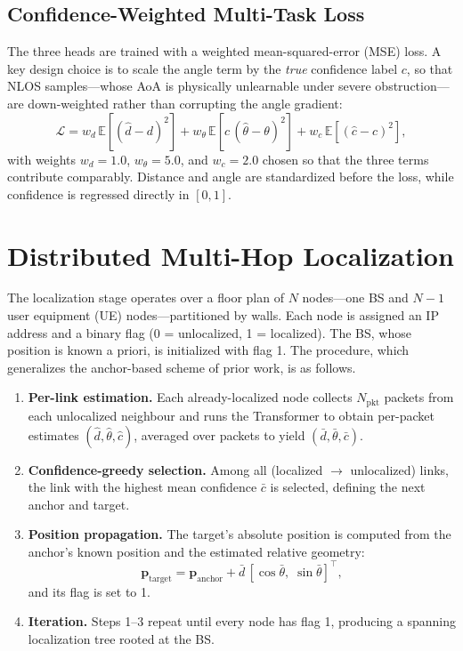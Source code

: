 \documentclass[conference]{IEEEtran}
\begin{document}
\subsection{Confidence-Weighted Multi-Task Loss}
The three heads are trained with a weighted mean-squared-error (MSE) loss. A key
design choice is to scale the angle term by the \emph{true} confidence label
$c$, so that NLOS samples---whose AoA is physically unlearnable under severe
obstruction---are down-weighted rather than corrupting the angle gradient:
\begin{equation}
  \mathcal{L} = w_{d}\,\mathbb{E}\!\left[(\hat{d}-d)^2\right]
    + w_{\theta}\,\mathbb{E}\!\left[c\,(\hat{\theta}-\theta)^2\right]
    + w_{c}\,\mathbb{E}\!\left[(\hat{c}-c)^2\right],
\label{eq:loss}
\end{equation}
with weights $w_{d}=1.0$, $w_{\theta}=5.0$, and $w_{c}=2.0$ chosen so that the
three terms contribute comparably. Distance and angle are standardized before
the loss, while confidence is regressed directly in $[0,1]$.

\section{Distributed Multi-Hop Localization}
\label{sec:localization}

The localization stage operates over a floor plan of $N$ nodes---one BS and
$N-1$ user equipment (UE) nodes---partitioned by walls. Each node is assigned an
IP address and a binary flag (0 = unlocalized, 1 = localized). The BS, whose
position is known a priori, is initialized with flag 1. The procedure, which
generalizes the anchor-based scheme of prior work, is as follows.

\begin{enumerate}
\item \textbf{Per-link estimation.} Each already-localized node collects
      $N_{\mathrm{pkt}}$ packets from each unlocalized neighbour and runs the
      Transformer to obtain per-packet estimates
      $(\hat{d},\hat{\theta},\hat{c})$, averaged over packets to yield
      $(\bar{d},\bar{\theta},\bar{c})$.
\item \textbf{Confidence-greedy selection.} Among all
      (localized $\to$ unlocalized) links, the link with the highest mean
      confidence $\bar{c}$ is selected, defining the next anchor and target.
\item \textbf{Position propagation.} The target's absolute position is computed
      from the anchor's known position and the estimated relative geometry:
      \begin{equation}
        \mathbf{p}_{\mathrm{target}} = \mathbf{p}_{\mathrm{anchor}}
          + \bar{d}\,[\cos\bar{\theta},\; \sin\bar{\theta}]^{\top},
      \label{eq:position}
      \end{equation}
      and its flag is set to 1.
\item \textbf{Iteration.} Steps 1--3 repeat until every node has flag 1,
      producing a spanning localization tree rooted at the BS.
\end{enumerate}
\end{document}
